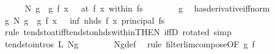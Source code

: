 \begin{isabellebody}
\isanewline
\ \ \ \ \isamarkupfalse%
\ {\isachardoublequoteopen}{\isacharparenleft}{\kern0pt}{\isacharparenleft}{\kern0pt}{\isacharquery}{\kern0pt}N\ g\ \ g{\isacharprime}{\kern0pt}\ {\isacharparenleft}{\kern0pt}f\ x{\isacharparenright}{\kern0pt}{\isacharparenright}{\kern0pt}\ {\isasymlonglongrightarrow}\ {}{\isacharparenright}{\kern0pt}\ {\isacharparenleft}{\kern0pt}at\ {\isacharparenleft}{\kern0pt}f\ x{\isacharparenright}{\kern0pt}\ within\ f{\isacharbackquote}{\kern0pt}s{\isacharparenright}{\kern0pt}{\isachardoublequoteclose}\isanewline
\ \ \ \ \ \ \isamarkupfalse%
\ g\ \isamarkupfalse%
\ has{\isacharunderscore}{\kern0pt}derivative{\isacharunderscore}{\kern0pt}iff{\isacharunderscore}{\kern0pt}norm\ \isacommand{{\isachardot}{\kern0pt}{\isachardot}{\kern0pt}}\isamarkupfalse%
\isanewline
\ \ \ \ \isamarkupfalse%
\ \isamarkupfalse%
\ g{\isacharprime}{\kern0pt}{\isacharcolon}{\kern0pt}\ {\isachardoublequoteopen}{\isacharparenleft}{\kern0pt}{\isacharparenleft}{\kern0pt}{\isacharquery}{\kern0pt}N\ g\ \ g{\isacharprime}{\kern0pt}\ {\isacharparenleft}{\kern0pt}f\ x{\isacharparenright}{\kern0pt}{\isacharparenright}{\kern0pt}\ {\isasymlonglongrightarrow}\ {}{\isacharparenright}{\kern0pt}\ {\isacharparenleft}{\kern0pt}inf\ {\isacharparenleft}{\kern0pt}nhds\ {\isacharparenleft}{\kern0pt}f\ x{\isacharparenright}{\kern0pt}{\isacharparenright}{\kern0pt}\ {\isacharparenleft}{\kern0pt}principal\ {\isacharparenleft}{\kern0pt}f{\isacharbackquote}{\kern0pt}s{\isacharparenright}{\kern0pt}{\isacharparenright}{\kern0pt}{\isacharparenright}{\kern0pt}{\isachardoublequoteclose}\isanewline
\ \ \ \ \ \ \isamarkupfalse%
\ {\isacharparenleft}{\kern0pt}rule\ tendsto{\isacharunderscore}{\kern0pt}at{\isacharunderscore}{\kern0pt}iff{\isacharunderscore}{\kern0pt}tendsto{\isacharunderscore}{\kern0pt}nhds{\isacharunderscore}{\kern0pt}within{\isacharbrackleft}{\kern0pt}THEN\ iffD{}{\isacharcomma}{\kern0pt}\ rotated{\isacharbrackright}{\kern0pt}{\isacharparenright}{\kern0pt}\ simp\isanewline
\isanewline
\ \ \ \ \isamarkupfalse%
\ {\isacharbrackleft}{\kern0pt}tendsto{\isacharunderscore}{\kern0pt}intros{\isacharbrackright}{\kern0pt}{\isacharcolon}{\kern0pt}\ {\isachardoublequoteopen}{\isacharquery}{\kern0pt}L\ Ng{\isachardoublequoteclose}\isanewline
\ \ \ \ \ \ \isamarkupfalse%
\ Ng{\isacharunderscore}{\kern0pt}def\ \isamarkupfalse%
\ {\isacharparenleft}{\kern0pt}rule\ filterlim{\isacharunderscore}{\kern0pt}compose{\isacharbrackleft}{\kern0pt}OF\ g{\isacharprime}{\kern0pt}\ f{\isacharprime}{\kern0pt}{\isacharbrackright}{\kern0pt}{\isacharparenright}{\kern0pt}\isanewline

\end{isabellebody}
